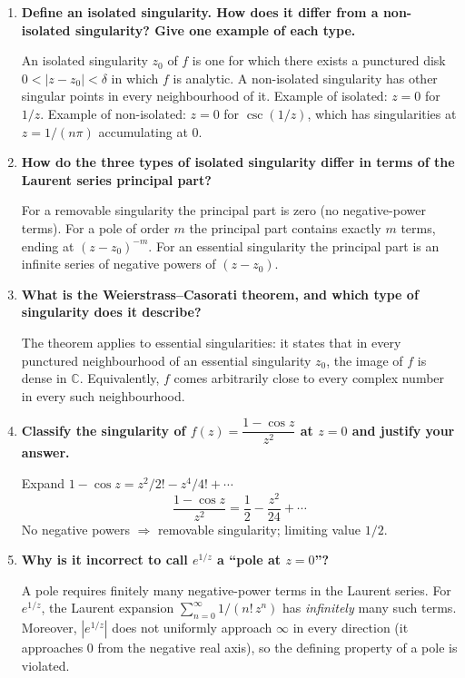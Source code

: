 \documentclass[12pt,a4paper]{article}
\begin{document}
\begin{enumerate}[label=\textbf{V\arabic*.}, leftmargin=2.5em]

\item \textbf{Define an isolated singularity. How does it differ from a non-isolated singularity?
Give one example of each type.}

An isolated singularity $z_0$ of $f$ is one for which there exists a punctured disk
$0 < |z - z_0| < \delta$ in which $f$ is analytic. A non-isolated singularity has other singular
points in every neighbourhood of it. Example of isolated: $z = 0$ for $1/z$. Example of
non-isolated: $z = 0$ for $\csc(1/z)$, which has singularities at $z = 1/(n\pi)$ accumulating
at $0$.

\item \textbf{How do the three types of isolated singularity differ in terms of the Laurent series
principal part?}

For a removable singularity the principal part is zero (no negative-power terms). For a pole of
order $m$ the principal part contains exactly $m$ terms, ending at $(z-z_0)^{-m}$. For an
essential singularity the principal part is an infinite series of negative powers of $(z-z_0)$.

\item \textbf{What is the Weierstrass--Casorati theorem, and which type of singularity does it
describe?}

The theorem applies to essential singularities: it states that in every punctured neighbourhood
of an essential singularity $z_0$, the image of $f$ is dense in $\mathbb{C}$. Equivalently, $f$
comes arbitrarily close to every complex number in every such neighbourhood.

\item \textbf{Classify the singularity of $f(z) = \dfrac{1 - \cos z}{z^2}$ at $z = 0$ and justify
your answer.}

Expand $1 - \cos z = z^2/2! - z^4/4! + \cdots$
\[
  \frac{1-\cos z}{z^2} = \frac{1}{2} - \frac{z^2}{24} + \cdots
\]
No negative powers $\Rightarrow$ removable singularity; limiting value $1/2$.

\item \textbf{Why is it incorrect to call $e^{1/z}$ a ``pole at $z = 0$''?}

A pole requires finitely many negative-power terms in the Laurent series. For $e^{1/z}$, the
Laurent expansion $\sum_{n=0}^{\infty} 1/(n!\,z^n)$ has \emph{infinitely} many such terms.
Moreover, $|e^{1/z}|$ does not uniformly approach $\infty$ in every direction (it approaches $0$
from the negative real axis), so the defining property of a pole is violated.


\end{enumerate}
\end{document}
